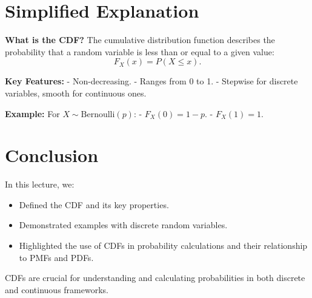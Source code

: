 \documentclass{article}
\begin{document}
\section*{Simplified Explanation}

\textbf{What is the CDF?}
The cumulative distribution function describes the probability that a random variable is less than or equal to a given value:
\[
  F_X(x) = P(X \leq x).
\]

\textbf{Key Features:}
- Non-decreasing.
- Ranges from 0 to 1.
- Stepwise for discrete variables, smooth for continuous ones.

\textbf{Example:}
For $X \sim \text{Bernoulli}(p)$:
- $F_X(0) = 1-p$.
- $F_X(1) = 1$.

\section*{Conclusion}

In this lecture, we:
\begin{itemize}
  \item Defined the CDF and its key properties.
  \item Demonstrated examples with discrete random variables.
  \item Highlighted the use of CDFs in probability calculations and their relationship to PMFs and PDFs.
\end{itemize}

CDFs are crucial for understanding and calculating probabilities in both discrete and continuous frameworks.
\end{document}
